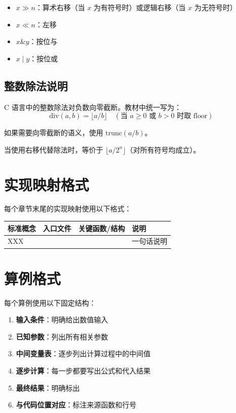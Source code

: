 \begin{itemize}
  \item $x \gg n$：算术右移（当 $x$ 为有符号时）或逻辑右移（当 $x$ 为无符号时）
  \item $x \ll n$：左移
  \item $x \mathbin{\&} y$：按位与
  \item $x \mid y$：按位或
\end{itemize}

\subsection{整数除法说明}

C 语言中的整数除法对负数向零截断。教材中统一写为：
\begin{equation}
\mathrm{div}(a, b) = \lfloor a / b \rfloor \quad (\text{当 } a \geq 0 \text{ 或 } b > 0 \text{ 时取 floor})
\end{equation}

如果需要向零截断的语义，使用 $\mathrm{trunc}(a / b)$。

当使用右移代替除法时，等价于 $\lfloor a / 2^n \rfloor$（对所有符号均成立）。

\section{实现映射格式}

每个章节末尾的实现映射使用以下格式：

\begin{implmap}
\begin{tabular}{@{}L{1.8cm}L{1.5cm}L{3.0cm}L{4.5cm}@{}}
\toprule
标准概念 & 入口文件 & 关键函数/结构 & 说明 \\
\midrule
XXX &  &  & 一句话说明 \\
\bottomrule
\end{tabular}
\end{implmap}

\section{算例格式}

每个算例使用以下固定结构：

\begin{enumerate}
  \item \textbf{输入条件}：明确给出数值输入
  \item \textbf{已知参数}：列出所有相关参数
  \item \textbf{中间变量表}：逐步列出计算过程中的中间值
  \item \textbf{逐步计算}：每一步都要写出公式和代入结果
  \item \textbf{最终结果}：明确标出
  \item \textbf{与代码位置对应}：标注来源函数和行号
\end{enumerate}

